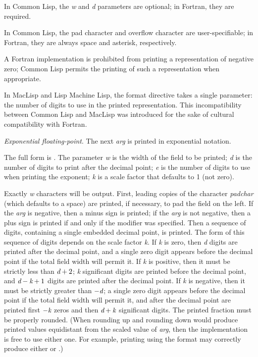 \begin{flushdesc}
\begin{incompatibility}
In Common Lisp, the \emph{w} and \emph{d}
parameters are optional; in Fortran, they are required.

In Common Lisp, the pad character and overflow character are user-specifiable;
in Fortran, they are always space and asterisk, respectively.

A Fortran implementation
is prohibited from printing a representation of negative zero;
Common Lisp permits the printing of such a representation when appropriate.

In MacLisp and Lisp Machine Lisp, the  format directive takes
a single parameter: the number of digits to use in the printed
representation.  This incompatibility between
Common Lisp and MacLisp was introduced for the sake of cultural compatibility
with Fortran.
\end{incompatibility}
\afternoterule

\item[\cd{{\Xtilde}E}]
\emph{Exponential floating-point}.
The next \emph{arg} is printed in exponential notation.

The full form is .
The parameter \emph{w}
is the width of the field to be printed; \emph{d} is the number
of digits to print after the decimal point; \emph{e} is the number
of digits to use when printing the exponent;
\emph{k} is a scale factor that defaults to 1 (not zero).

Exactly \emph{w} characters will
be output.  First, leading copies of the character \emph{padchar}
(which defaults to a space) are printed, if necessary, to pad the
field on the left.
If the \emph{arg} is negative, then a minus sign is printed;
if the \emph{arg} is not negative, then a plus sign is printed
if and only if the \cd{{\Xatsign}} modifier was specified.  Then a sequence
of digits, containing a single embedded decimal point, is printed.
The form of this sequence of digits depends on the scale factor \emph{k}.
If \emph{k} is zero, then \emph{d} digits are printed after the decimal
point, and a single zero digit appears before the decimal point if
the total field width will permit it.  If \emph{k} is positive,
then it must be strictly less than $\emph{d}+2$;  \emph{k} significant digits
are printed before the decimal point, and $\emph{d}-\emph{k}+1$
digits are printed after the decimal point.  If \emph{k} is negative,
then it must be strictly greater than $-\emph{d}$;
a single zero digit appears before the decimal point if
the total field width will permit it, and after the decimal point
are printed first
$-\emph{k}$ zeros and then $\emph{d}+\emph{k}$ significant digits.
The printed fraction must be properly rounded.
(When rounding up and rounding down would produce printed values
equidistant from the scaled value of \emph{arg}, then the implementation
is free to use either one.  For example, printing
 using the format  may correctly produce
either  or .)


\end{flushdesc}
